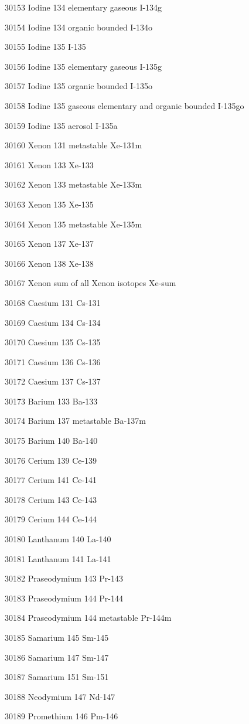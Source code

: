 30153 Iodine 134 elementary gaseous I-134g

30154 Iodine 134 organic bounded I-134o

30155 Iodine 135 I-135

30156 Iodine 135 elementary gaseous I-135g

30157 Iodine 135 organic bounded I-135o

30158 Iodine 135 gaseous elementary and organic bounded I-135go

30159 Iodine 135 aerosol I-135a

30160 Xenon 131 metastable Xe-131m

30161 Xenon 133 Xe-133

30162 Xenon 133 metastable Xe-133m

30163 Xenon 135 Xe-135

30164 Xenon 135 metastable Xe-135m

30165 Xenon 137 Xe-137

30166 Xenon 138 Xe-138

30167 Xenon sum of all Xenon isotopes Xe-sum

30168 Caesium 131 Cs-131

30169 Caesium 134 Cs-134

30170 Caesium 135 Cs-135

30171 Caesium 136 Cs-136

30172 Caesium 137 Cs-137

30173 Barium 133 Ba-133

30174 Barium 137 metastable Ba-137m

30175 Barium 140 Ba-140

30176 Cerium 139 Ce-139

30177 Cerium 141 Ce-141

30178 Cerium 143 Ce-143

30179 Cerium 144 Ce-144

30180 Lanthanum 140 La-140

30181 Lanthanum 141 La-141

30182 Praseodymium 143 Pr-143

30183 Praseodymium 144 Pr-144

30184 Praseodymium 144 metastable Pr-144m

30185 Samarium 145 Sm-145

30186 Samarium 147 Sm-147

30187 Samarium 151 Sm-151

30188 Neodymium 147 Nd-147

30189 Promethium 146 Pm-146

